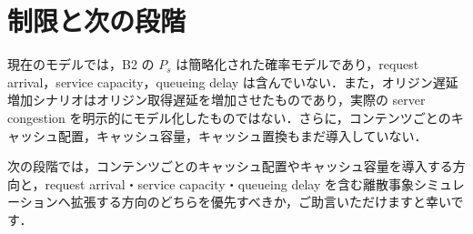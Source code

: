 \documentclass[paper=a4,fontsize=9pt]{jlreq}
\begin{document}
\section{制限と次の段階}
現在のモデルでは，B2 の $P_s$ は簡略化された確率モデルであり，request arrival，service capacity，queueing delay は含んでいない．また，オリジン遅延増加シナリオはオリジン取得遅延を増加させたものであり，実際の server congestion を明示的にモデル化したものではない．さらに，コンテンツごとのキャッシュ配置，キャッシュ容量，キャッシュ置換もまだ導入していない．

次の段階では，コンテンツごとのキャッシュ配置やキャッシュ容量を導入する方向と，request arrival・service capacity・queueing delay を含む離散事象シミュレーションへ拡張する方向のどちらを優先すべきか，ご助言いただけますと幸いです．
\end{document}
